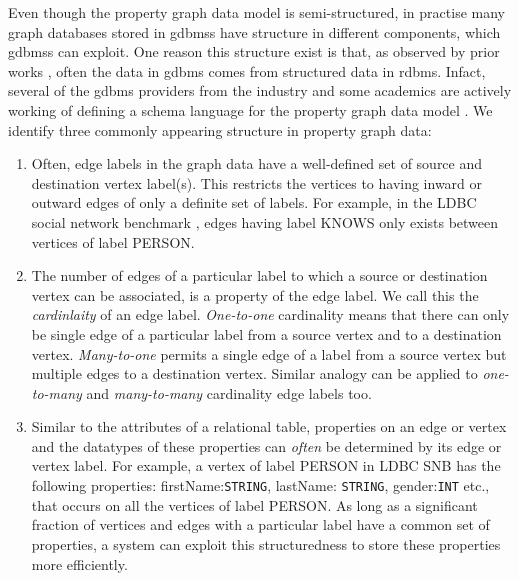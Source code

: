 \begin{guideline}
\label{gdln:graph-schema}
Even though the property graph data model is semi-structured, in practise many graph databases stored in \gls{gdbms}s have structure in different components, which \gls{gdbms}s can exploit. One reason this structure exist is that, as observed by prior works \cite{survey}, often the data in \gls{gdbms} comes from structured data in \gls{rdbms}. Infact, several of the \gls{gdbms} providers from the industry and some academics are actively working of defining a schema language for the property graph data model \cite{schema-validation-bonifati, defining-schema-hartig}. We identify three commonly appearing structure in property graph data:

\begin{enumerate}
	
	\label{gdln:graph-schema-rule1}
	\item Often, edge labels in the graph data have a well-defined set of source and destination vertex label(s). This restricts the vertices to  having inward or outward edges of only a definite set of labels. For example, in the LDBC social network benchmark \cite{ldbc}, edges having label KNOWS only exists between vertices of label PERSON.
	
	\label{gdln:graph-schema-rule1}
	\item The number of edges of a particular label to which a source or destination vertex can be associated, is a property of the edge label. We call this the \emph{cardinlaity} of an edge label. \emph{One-to-one} cardinality means that there can only be single edge of a particular label from a source vertex and to a destination vertex. \emph{Many-to-one} permits a single edge of a label from a source vertex but multiple edges to a destination vertex. Similar analogy can be applied to \emph{one-to-many} and \emph{many-to-many} cardinality edge labels too.
	
	\item Similar to the attributes of a relational table, properties on an edge or vertex and the datatypes of these properties can \emph{often} be determined by its edge or vertex label. For example, a vertex of label PERSON in LDBC SNB has the following properties: firstName:\texttt{STRING}, lastName: \texttt{STRING}, gender:\texttt{INT} etc., that occurs on all the vertices of label PERSON. As long as a significant fraction of vertices and edges with a particular label have a common set of properties, a system can exploit this structuredness to store these properties more efficiently. 
	

\end{enumerate}
\end{guideline}
